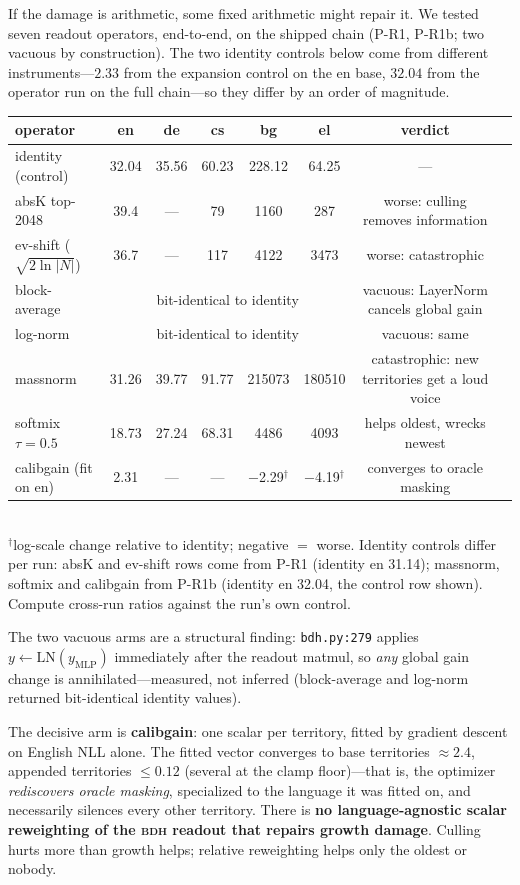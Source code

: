 \documentclass[11pt]{article}
\theoremstyle{definition}\newtheorem{definition}{Definition}
\theoremstyle{remark}\newtheorem{remark}{Remark}
\newcommand{\BDH}{\textsc{bdh}}
\begin{document}
If the damage is arithmetic, some fixed arithmetic might repair it. We tested seven
readout operators, end-to-end, on the shipped chain (P-R1, P-R1b; two vacuous by
construction). The two identity controls below come from different instruments---$2.33$ from the expansion control on the en base, $32.04$ from the operator run on the full chain---so they differ by an order of magnitude.

\begin{center}\small
\begin{tabular}{lccccccl}
\toprule
operator & en & de & cs & bg & el & verdict \\
\midrule
identity (control) & 32.04 & 35.56 & 60.23 & 228.12 & 64.25 & --- \\
absK top-2048 & 39.4 & --- & 79 & 1160 & 287 & worse: culling removes information \\
ev-shift ($\sqrt{2\ln|N|}$) & 36.7 & --- & 117 & 4122 & 3473 & worse: catastrophic \\
block-average & \multicolumn{5}{c}{bit-identical to identity} & vacuous: LayerNorm cancels global gain \\
log-norm & \multicolumn{5}{c}{bit-identical to identity} & vacuous: same \\
massnorm & 31.26 & 39.77 & 91.77 & 215073 & 180510 & catastrophic: new territories get a loud voice \\
softmix $\tau{=}0.5$ & 18.73 & 27.24 & 68.31 & 4486 & 4093 & helps oldest, wrecks newest \\
calibgain (fit on en) & 2.31 & --- & --- & $-$2.29$^\dagger$ & $-$4.19$^\dagger$ & converges to oracle masking \\
\bottomrule
\end{tabular}\\
\footnotesize $^\dagger$log-scale change relative to identity; negative $=$ worse. Identity controls differ per run: absK and ev-shift rows come from P-R1 (identity en 31.14); massnorm, softmix and calibgain from P-R1b (identity en 32.04, the control row shown). Compute cross-run ratios against the run's own control.
\end{center}

The two vacuous arms are a structural finding: \texttt{bdh.py:279} applies
$y \leftarrow \mathrm{LN}(y_{\mathrm{MLP}})$ immediately after the readout matmul, so
\emph{any} global gain change is annihilated---measured, not inferred (block-average and
log-norm returned bit-identical identity values).

The decisive arm is \textbf{calibgain}: one scalar per territory, fitted by gradient descent
on English NLL alone. The fitted vector converges to base territories $\approx 2.4$,
appended territories $\le 0.12$ (several at the clamp floor)---that is, the optimizer
\emph{rediscovers oracle masking}, specialized to the language it was fitted on, and
necessarily silences every other territory. There is \textbf{no language-agnostic scalar
reweighting of the \BDH{} readout that repairs growth damage}. Culling hurts more than
growth helps; relative reweighting helps only the oldest or nobody.
\end{document}
